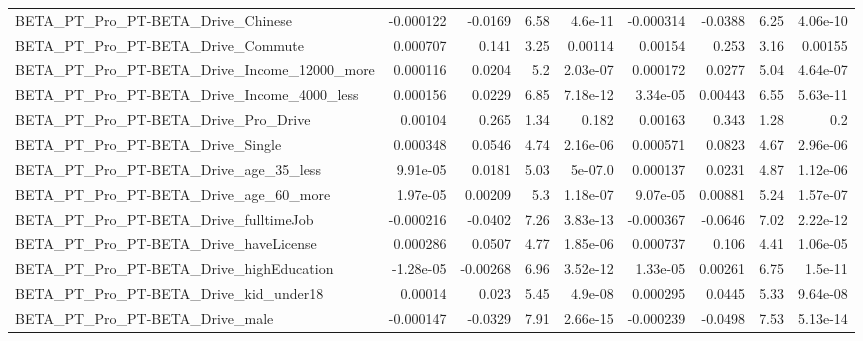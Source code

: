 \begin{tabular}{lrrrrrrrr}
BETA\_PT\_Pro\_PT-BETA\_Drive\_Chinese                  &   -0.000122 &      -0.0169 &      6.58 &  4.6e-11 &  -0.000314 &     -0.0388 &         6.25 &      4.06e-10 \\
BETA\_PT\_Pro\_PT-BETA\_Drive\_Commute                  &    0.000707 &        0.141 &      3.25 &  0.00114 &    0.00154 &       0.253 &         3.16 &       0.00155 \\
BETA\_PT\_Pro\_PT-BETA\_Drive\_Income\_12000\_more        &    0.000116 &       0.0204 &       5.2 & 2.03e-07 &   0.000172 &      0.0277 &         5.04 &      4.64e-07 \\
BETA\_PT\_Pro\_PT-BETA\_Drive\_Income\_4000\_less         &    0.000156 &       0.0229 &      6.85 & 7.18e-12 &   3.34e-05 &     0.00443 &         6.55 &      5.63e-11 \\
BETA\_PT\_Pro\_PT-BETA\_Drive\_Pro\_Drive                &     0.00104 &        0.265 &      1.34 &    0.182 &    0.00163 &       0.343 &         1.28 &           0.2 \\
BETA\_PT\_Pro\_PT-BETA\_Drive\_Single                   &    0.000348 &       0.0546 &      4.74 & 2.16e-06 &   0.000571 &      0.0823 &         4.67 &      2.96e-06 \\
BETA\_PT\_Pro\_PT-BETA\_Drive\_age\_35\_less              &    9.91e-05 &       0.0181 &      5.03 &  5e-07.0 &   0.000137 &      0.0231 &         4.87 &      1.12e-06 \\
BETA\_PT\_Pro\_PT-BETA\_Drive\_age\_60\_more              &    1.97e-05 &      0.00209 &       5.3 & 1.18e-07 &   9.07e-05 &     0.00881 &         5.24 &      1.57e-07 \\
BETA\_PT\_Pro\_PT-BETA\_Drive\_fulltimeJob              &   -0.000216 &      -0.0402 &      7.26 & 3.83e-13 &  -0.000367 &     -0.0646 &         7.02 &      2.22e-12 \\
BETA\_PT\_Pro\_PT-BETA\_Drive\_haveLicense              &    0.000286 &       0.0507 &      4.77 & 1.85e-06 &   0.000737 &       0.106 &         4.41 &      1.06e-05 \\
BETA\_PT\_Pro\_PT-BETA\_Drive\_highEducation            &   -1.28e-05 &     -0.00268 &      6.96 & 3.52e-12 &   1.33e-05 &     0.00261 &         6.75 &       1.5e-11 \\
BETA\_PT\_Pro\_PT-BETA\_Drive\_kid\_under18              &     0.00014 &        0.023 &      5.45 &  4.9e-08 &   0.000295 &      0.0445 &         5.33 &      9.64e-08 \\
BETA\_PT\_Pro\_PT-BETA\_Drive\_male                     &   -0.000147 &      -0.0329 &      7.91 & 2.66e-15 &  -0.000239 &     -0.0498 &         7.53 &      5.13e-14 \\

\end{tabular}
